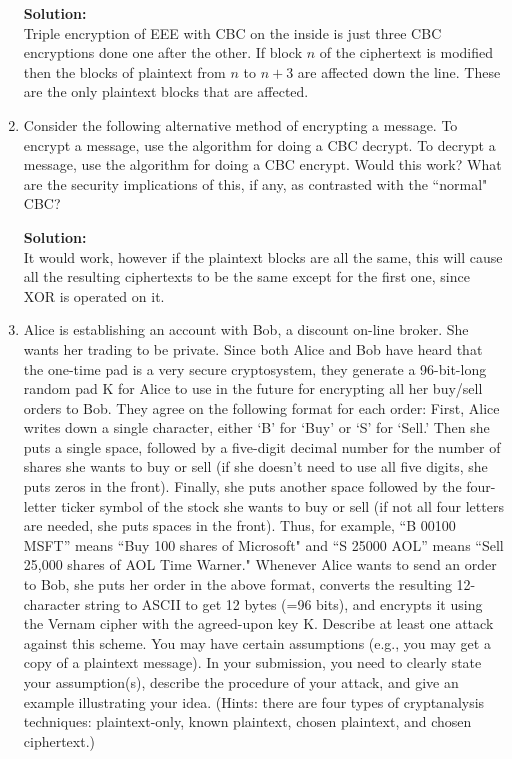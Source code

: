 \documentclass[11pt]{article}
\begin{document}
\begin{enumerate}[1)]
\textbf{Solution: } \\
Triple encryption of EEE with CBC on the inside is just three CBC encryptions done one after the other.  If block $n$ of the ciphertext is modified then the blocks of plaintext from $n$ to $n+3$ are affected down the line.  These are the only plaintext blocks that are affected.  

\item Consider the following alternative method of encrypting a message. To encrypt a message, use the algorithm for doing a CBC decrypt. To decrypt a message, use the algorithm for doing a CBC encrypt. Would this work? What are the security implications of this, if any, as contrasted with the ``normal" CBC?

\textbf{Solution: } \\
It would work, however if the plaintext blocks are all the same, this will cause all the resulting ciphertexts to be the same except for the first one, since XOR is operated on it.  

\item Alice is establishing an account with Bob, a discount on-line broker. She wants her trading to be private. Since both Alice and Bob have heard that the one-time pad is a very secure cryptosystem, they generate a 96-bit-long random pad K for Alice to use in the future for encrypting all her buy/sell orders to Bob. They agree on the following format for each order: First, Alice writes down a single character, either `B' for `Buy' or `S' for `Sell.' Then she puts a single space, followed by a five-digit decimal number for the number of shares she wants to buy or sell (if she doesn't need to use all five digits, she puts zeros in the front). Finally, she puts another space followed by the four-letter ticker symbol of the stock she wants to buy or sell (if not all four letters are needed, she puts spaces in the front). Thus, for example, ``B 00100 MSFT'' means ``Buy 100 shares of Microsoft" and ``S 25000 AOL'' means ``Sell 25,000 shares of AOL Time Warner." Whenever Alice wants to send an order to Bob, she puts her order in the above format, converts the resulting 12-character string to ASCII to get 12 bytes (=96 bits), and encrypts it using the Vernam cipher with the agreed-upon key K. Describe at least one attack against this scheme. You may have certain assumptions (e.g., you may get a copy of a plaintext message). In your submission, you need to clearly state your assumption(s), describe the procedure of your attack, and give an example illustrating your idea. (Hints: there are four types of cryptanalysis techniques: plaintext-only, known plaintext, chosen plaintext, and chosen ciphertext.)


\end{enumerate}
\end{document}
